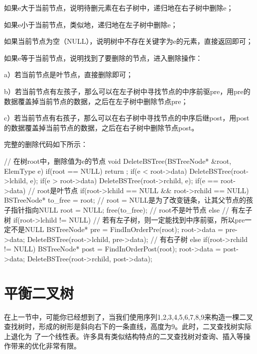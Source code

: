  如果e大于当前节点，说明待删元素在右子树中，递归地在右子树中删除e；

 如果e小于当前节点，类似地，递归地在左子树中删除e；

 如果当前节点为空（NULL），说明树中不存在关键字为e的元素，直接返回即可；

 如果e等于当前节点，说明找到了要删除的节点，进入删除操作：

a）若当前节点是叶节点，直接删除即可；

b）若当前节点有左孩子，那么可以在左子树中寻找节点的中序前驱pre，用pre的数据覆盖掉当前节点的数据，之后在左子树中删除节点pre；

c）若当前节点有右孩子，那么可以在右子树中寻找节点的中序后继post，用post的数据覆盖掉当前节点的数据，之后在右子树中删除节点post。

完整的删除代码如下所示：
\begin{cppcode}
// 在树root中，删除值为e的节点
    void DeleteBSTree(BSTreeNode* &root, ElemType e) {
        if(root == NULL) {
            return ;
        }
        if(e < root->data) {
            DeleteBSTree(root->lchild, e);
        }
        if(e > root->data) {
            DeleteBSTree(root->rchild, e);
        }
        if(e == root->data) {
            // root是叶节点
            if(root->lchild == NULL && root->rchild == NULL) {
                BSTreeNode* to_free = root;
                // root = NULL是为了改变链条，让其父节点的孩子指针指向NULL
                root = NULL;
                free(to_free);
            }
            // root不是叶节点
            else {
                // 有左子树
                if(root->lchild != NULL) {
                    // 若有左子树，则一定能找到中序前驱，所以pre一定不是NULL
                    BSTreeNode* pre = FindInOrderPre(root);
                    root->data = pre->data;
                    DeleteBSTree(root->lchild, pre->data);
                } 
                // 有右子树
                else if(root->rchild != NULL) {
                    BSTreeNode* post = FindInOrderPost(root);
                    root->data = post->data;
                    DeleteBSTree(root->rchild, post->data);
                }
            }
        }
    }
\end{cppcode}

\section{平衡二叉树}
在上一节中，可能你已经想到了，当我们使用序列{1,2,3,4,5,6,7,8,9}来构造一棵二叉查找树时，形成的树形是斜向右下的一条直线，高度为9。此时，二叉查找树实际上退化为
了一个线性表。许多具有类似结构特点的二叉查找树对查询、插入等操作带来的优化非常有限。


